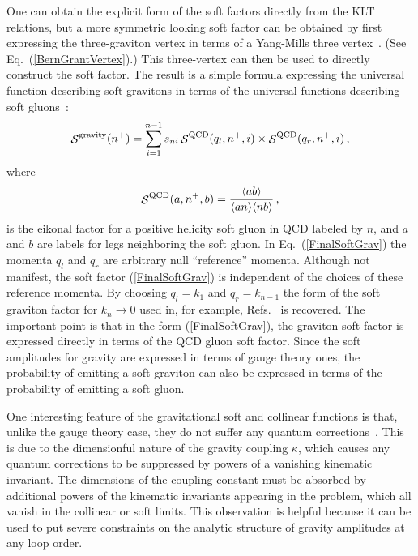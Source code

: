 One can obtain the explicit form of the soft factors directly from
the KLT relations, but a more symmetric looking soft factor can be
obtained by first expressing the three-graviton vertex in terms of a
Yang-Mills three vertex~\cite{BernGrant}.  (See
Eq.~(\ref{BernGrantVertex}).) This three-vertex can then be used to 
directly construct the soft factor.  The result is a simple formula
expressing the universal function describing soft gravitons in terms of
the universal functions describing soft gluons~\cite{BernGrant}:
\begin{equation}
{\mathop {\cal S} \nolimits}^{\rm gravity}(n^+) = \sum_{i=1}^{n-1} s_{ni} \,
          {\mathop {\cal S} \nolimits}^{\rm QCD}(q_l, n^+, i) \times 
          {\mathop {\cal S} \nolimits}^{\rm QCD}(q_r, n^+, i) \,,
\label{FinalSoftGrav}
\end{equation}
%
where
%
\begin{equation}
{\mathop {\cal S} \nolimits}^{\rm QCD}(a, n^+, b) 
= {\langle {a}{b}\rangle \over 
     \langle{a}{n}\rangle \langle{n}{b}\rangle}\,,
\end{equation}
%
is the eikonal factor for a positive helicity soft gluon in QCD
labeled by $n$, and $a$ and $b$ are labels for legs neighboring the
soft gluon.  In Eq.~(\ref{FinalSoftGrav}) the momenta $q_l$ and $q_r$
are arbitrary null ``reference'' momenta.  Although not manifest, the
soft factor (\ref{FinalSoftGrav}) is independent of the choices of
these reference momenta.  By choosing $q_l = k_1$ and $q_r = k_{n-1}$
the form of the soft graviton factor for $k_n \rightarrow 0$ used in,
for example, Refs.~\cite{BGK,AllPlusGrav,MHVGrav} is recovered.  The
important point is that in the form (\ref{FinalSoftGrav}), the
graviton soft factor is expressed directly in terms of the QCD gluon
soft factor.  Since the soft amplitudes for gravity are expressed in
terms of gauge theory ones, the probability of emitting a soft
graviton can also be expressed in terms of the probability of emitting
a soft gluon.

One interesting feature of the gravitational soft and collinear
functions is that, unlike the gauge theory case, they do not suffer
any quantum corrections~\cite{MHVGrav}.  This is due to the
dimensionful nature of the gravity coupling $\kappa$, which causes any
quantum corrections to be suppressed by powers of a vanishing
kinematic invariant. The dimensions of the coupling constant must be
absorbed by additional powers of the kinematic invariants appearing in
the problem, which all vanish in the collinear or soft limits.  This
observation is helpful because it can be used to put severe
constraints on the analytic structure of gravity amplitudes at any
loop order.

